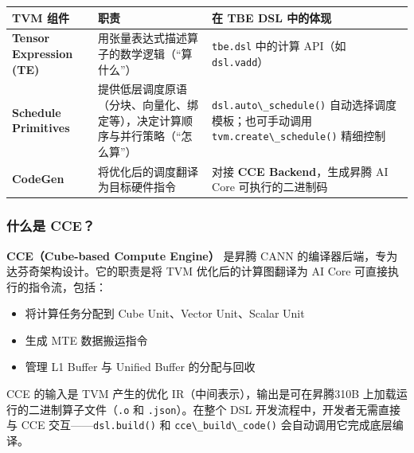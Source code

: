 \begin{longtable}[]{@{}
  >{\raggedright\arraybackslash}p{}
  >{\raggedright\arraybackslash}p{}
  >{\raggedright\arraybackslash}p{}@{}}
\toprule\noalign{}
\begin{minipage}[b]{\linewidth}\raggedright
TVM 组件
\end{minipage} & \begin{minipage}[b]{\linewidth}\raggedright
职责
\end{minipage} & \begin{minipage}[b]{\linewidth}\raggedright
在 TBE DSL 中的体现
\end{minipage} \\
\midrule\noalign{}
\endhead
\bottomrule\noalign{}
\endlastfoot
\textbf{Tensor Expression (TE)} &
用张量表达式描述算子的数学逻辑（``算什么''） &
\passthrough{\lstinline!tbe.dsl!} 中的计算 API（如
\passthrough{\lstinline!dsl.vadd!}） \\
\textbf{Schedule Primitives} &
提供低层调度原语（分块、向量化、绑定等），决定计算顺序与并行策略（``怎么算''）
& \passthrough{\lstinline!dsl.auto\_schedule()!}
自动选择调度模板；也可手动调用
\passthrough{\lstinline!tvm.create\_schedule()!} 精细控制 \\
\textbf{CodeGen} & 将优化后的调度翻译为目标硬件指令 & 对接 \textbf{CCE
Backend}，生成昇腾 AI Core 可执行的二进制码 \\
\end{longtable}

\subsubsection{什么是 CCE？}\label{src-book-chapter7-h15}

\textbf{CCE（Cube-based Compute Engine）} 是昇腾 CANN
的编译器后端，专为达芬奇架构设计。它的职责是将 TVM 优化后的计算图翻译为
AI Core 可直接执行的指令流，包括：

\begin{itemize}
\tightlist
\item
  将计算任务分配到 Cube Unit、Vector Unit、Scalar Unit
\item
  生成 MTE 数据搬运指令
\item
  管理 L1 Buffer 与 Unified Buffer 的分配与回收
\end{itemize}

CCE 的输入是 TVM 产生的优化 IR（中间表示），输出是可在昇腾310B
上加载运行的二进制算子文件（\passthrough{\lstinline!.o!} 和
\passthrough{\lstinline!.json!}）。在整个 DSL
开发流程中，开发者无需直接与 CCE
交互------\passthrough{\lstinline!dsl.build()!} 和
\passthrough{\lstinline!cce\_build\_code()!} 会自动调用它完成底层编译。

